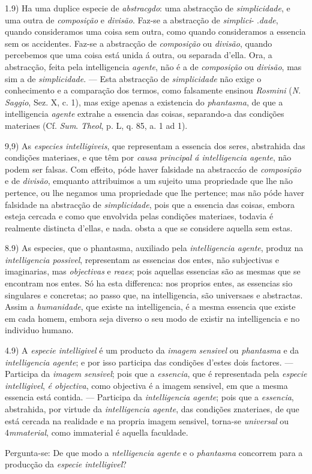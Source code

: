 1.9) Ha uma duplice especie de \emph{abstracgdo}: uma abstracção de \emph{simplicidade}, e uma outra de \emph{composição} e \emph{divisão}. Faz-se a abstracção de \emph{simplici}- .\emph{dade}, quando consideramos uma coisa sem outra, como quando consideramos a essencia sem os accidentes. Faz-se a abstracção de \emph{composição} ou \emph{divisão}, quando percebemos que uma coisa está unida á outra, ou separada d'ella. Ora, a abstracção, feita pela intelligencia \emph{agente}, não é a de \emph{composição} ou \emph{divisão}, mas sim a de \emph{simplicidade}. --- Esta abstracção de \emph{simplicidade} não exige o conhecimento e a comparação dos termos, como falsamente ensinou \emph{Rosmini} (\emph{N}. \emph{Saggio}, Sez. X, c. 1), mas exige apenas a existencia do \emph{phantasma}, de que a intelligencia \emph{agente} extrahe a essencia das coisas, separando-a das condições materiaes (Cf. \emph{Sum}. \emph{Theol}, p. L, q. 85, a. 1 ad 1).\par 9,9) As \emph{especies intelligiveis}, que representam a essencia dos seres, abstrahida das condições materiaes, e que têm por \emph{causa principal á intelligencia agente}, não podem ser falsas. Com effeito, póde haver falsidade na abstraccáo de \emph{composição} e de \emph{divisão}, emquanto attribuimos a um sujeito uma propriedade que lhe não pertence, ou lhe negamos uma propriedade que lhe pertence; mas não póde haver falsidade na abstracção de \emph{simplicidade}, pois que a essencia das coisas, embora esteja cercada e como que envolvida pelas condições materiaes, todavia é realmente distincta d'ellas, e nada. obsta a que se considere aquella sem estas.\par 8.9) As especies, que o phantasma, auxiliado pela \emph{intelligencia agente}, produz na \emph{intelligencia possivel}, representam as essencias dos entes, não subjectivas e imaginarias, mas \emph{objectivas} e \emph{reaes}; pois aquellas essencias são as mesmas que se encontram nos entes. Só ha esta differenca: nos proprios entes, as essencias sio singulares e concretas; ao passo que, na intelligencia, são universaes e abstractas. Assim a \emph{humanidade}, que existe na intelligencia, é a mesma essencia que existe em cada homem, embora seja diverso o seu modo de existir na intelligencia e no individuo humano.\par 4.9) A \emph{especie intelligivel} é um producto da \emph{imagem sensivel} ou \emph{phantasma} e da \emph{intelligencia agente}; e por isso participa das condições d'estes dois factores. --- Participa da \emph{imagem sensivel}; pois que a \emph{essencia}, que é representada pela \emph{especie intelligivel}, \emph{é objectiva}, como objectiva é a imagem sensivel, em que a mesma essencia está contida. --- Participa da \emph{intelligencia agente}; pois que a \emph{essencia}, abstrahida, por virtude da \emph{intelligencia agente}, das condições znateriaes, de que está cercada na realidade e na propria imagem sensivel, torna-se \emph{universal} ou 4\emph{mmaterial}, como immaterial é aquella faculdade.\par Pergunta-se: De que modo a \emph{ntelligencia agente} e o \emph{phantasma} concorrem para a producção da \emph{especie intelligivel}?\par 